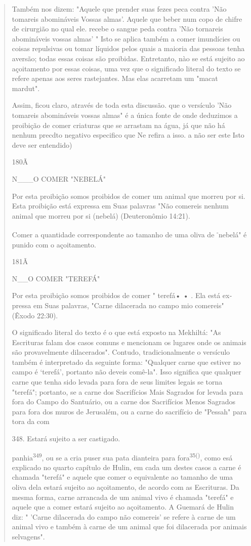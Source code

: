 \begin{quote}
Também nos dizem: "Aquele que prender suas fezes peca contra 'Não
tomareis abomináveis Vossas almas'. Aquele que beber num copo de chifre
de cirurgião no qual ele. recebe o sangue peda contra 'Não tornareis
abomináveis vossas almas' " Isto se aplica também a comer imundícies ou
coisas repulsivas ou tomar líquidos pelos quais a maioria das pessoas
tenha aversão; todas essas coisas são proibidas. Entretanto, nào se está
sujeito ao açoitamento por essas coisas, uma vez que o significado
literal do texto se refere apenas aos seres ras­tejantes. Mas elas
acarretam um "macat mardut".

Assim, ficou claro, através de toda esta discussão. que o versículo 'Não
tomareis abomináveis vossas almas" é a única fonte de onde deduzimos a
proibição de comer criaturas que se arrastam na água, já que não há
nenhum precdto negativo especifico que Ne refira a isso. a não ser este
Isto deve ser entendido)

180Ã

N\_\_\_O COMER "NEBELÁ"

Por esta proibição somos proibidos de comer um animal que mor­reu por
si. Esta proibição está expressa em Suas palavras "Não comereis ne­nhum
animal que morreu por si (nebelá) (Deuteronômio 14:21).

Comer a quantidade correspondente ao tamanho de uma oliva de
\textsuperscript{-}nebelá" é punido com o açoitamento.

181Ã

N\_\_O COMER "TEREFÁ"

Por esta proibição somos proibidos de comer " terefá• • . Ela está
ex­pressa em Suas palavras, "Carne dilacerada no campo mio comereis"
(Êxodo 22:30).

O significado literal do texto é o que está exposto na Mekhiltá: "As
Escrituras falam dos casos comuns e mencionam os lugares onde os
ani­mais são provavelmente dilacerados". Contudo, tradicionalmente o
versículo também é interpretado da seguinte forma: "Qualquer carne que
estiver no campo é `terefá', portanto não deveis comê-la". Isso
significa que qualquer carne que tenha sido levada para fora de seus
limites legais se torna "terefá"; portanto, se a carne dos Sacrifícios
Mais Sagrados for levada para fora do Cam­po do Santuário, ou a carne
dos Sacrifícios Menos Sagrados para fora dos mu­ros de Jerusalém, ou a
carne do sacrifício de "Pessah" para tora da com

348. Estará sujeito a ser castigado.

panhia\textsuperscript{349}, ou se a cria puser sua pata dianteira para
fora\textsuperscript{35()}, como esá explica­do no quarto capítulo de
Hulin, em cada um destes casos a carne é chamada "terefá" e aquele que
comer o equivalente ao tamanho de uma oliva dela estará sujeito ao
açoitamento, de acordo com as Escrituras. Da mesma forma, carne
arrancada de um animal vivo é chamada "terefá" e aquele que a comer
estará sujeito ao açoitamento. A Guemará de Hulin diz: " 'Carne
dilacerada do campo não comereis' se refere à carne de um animal vivo e
também à carne de um animal que foi dilacerada por animais selvagens".


\end{quote}
